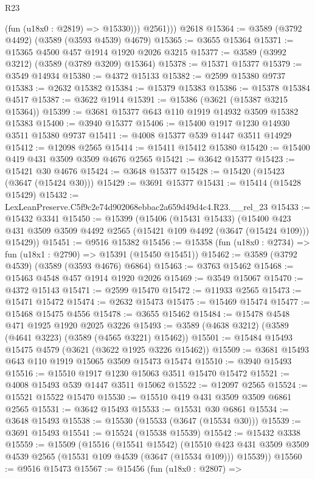 \begin{lexlean}{R23}
\begin{coremodule}
            (fun (u18x0 : @2819) => @15330)))
          @2561)))
    @2618
@15364 := @3589 (@3792 @4492) (@3589 (@3593 @4539) @4679)
@15365 := @3655 @15364
@15371 := @15365 @4500 @457 @1914 @1920 @2026 @3215
@15377 := @3589 (@3992 @3212) (@3589 (@3789 @3209) @15364)
@15378 := @15371 @15377
@15379 := @3549 @14934
@15380 := @4372 @15133
@15382 := @2599 @15380 @9737
@15383 := @2632 @15382
@15384 := @15379 @15383
@15386 := @15378 @15384 @4517
@15387 := @3622 @1914
@15391 := @15386 (@3621 (@15387 @3215 @15364))
@15399 := @3681 @15377 @643 @110 @1919 @14932 @3509 @15382 @15383
@15400 := @3940 @15377
@15406 := @15400 @1917 @1230 @14930 @3511 @15380 @9737
@15411 := @4008 @15377 @539 @1447 @3511 @14929
@15412 := @12098 @2565
@15414 := @15411 @15412 @15380
@15420 := @15400 @419 @431 @3509 @3509 @4676 @2565
@15421 := @3642 @15377
@15423 := @15421 @30 @4676
@15424 := @3648 @15377
@15428 := @15420 (@15423 (@3647 (@15424 @30)))
@15429 := @3691 @15377
@15431 := @15414 (@15428 @15429)
@15432 := LexLeanPreserve.C5f9c2e74d902068ebbac2a659d49d4c4.R23.__rel_23
@15433 := @15432 @3341
@15450 := @15399
    (@15406
      (@15431 @15433)
      (@15400 @423 @431 @3509 @3509 @4492 @2565 (@15421 @109 @4492 (@3647 (@15424 @109))) @15429))
@15451 := @9516 @15382
@15456 := @15358 (fun (u18x0 : @2734) => fun (u18x1 : @2790) => @15391 (@15450 @15451))
@15462 := @3589 (@3792 @4539) (@3589 (@3593 @4676) @6864)
@15463 := @3763 @15462
@15468 := @15463 @4548 @457 @1914 @1920 @2026
@15469 := @3549 @15067
@15470 := @4372 @15143
@15471 := @2599 @15470
@15472 := @11933 @2565
@15473 := @15471 @15472
@15474 := @2632 @15473
@15475 := @15469 @15474
@15477 := @15468 @15475 @4556
@15478 := @3655 @15462
@15484 := @15478 @4548 @471 @1925 @1920 @2025 @3226
@15493 := @3589 (@4638 @3212) (@3589 (@4641 @3223) (@3589 (@4565 @3221) @15462))
@15501 := @15484 @15493 @15475 @4579 (@3621 (@3622 @1925 @3226 @15462))
@15509 := @3681 @15493 @643 @110 @1919 @15065 @3509 @15473 @15474
@15510 := @3940 @15493
@15516 := @15510 @1917 @1230 @15063 @3511 @15470 @15472
@15521 := @4008 @15493 @539 @1447 @3511 @15062
@15522 := @12097 @2565
@15524 := @15521 @15522 @15470
@15530 := @15510 @419 @431 @3509 @3509 @6861 @2565
@15531 := @3642 @15493
@15533 := @15531 @30 @6861
@15534 := @3648 @15493
@15538 := @15530 (@15533 (@3647 (@15534 @30)))
@15539 := @3691 @15493
@15541 := @15524 (@15538 @15539)
@15542 := @15432 @3338
@15559 := @15509
    (@15516
      (@15541 @15542)
      (@15510 @423 @431 @3509 @3509 @4539 @2565 (@15531 @109 @4539 (@3647 (@15534 @109))) @15539))
@15560 := @9516 @15473
@15567 := @15456
    (fun (u18x0 : @2807) =>

\end{coremodule}
\end{lexlean}

